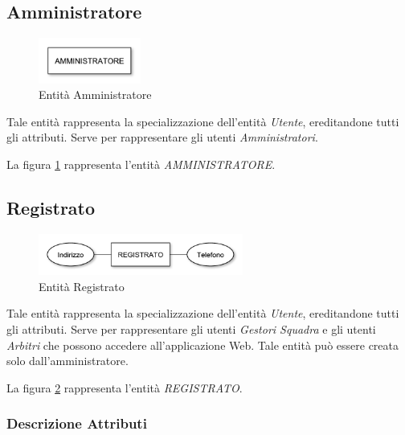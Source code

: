 	\subsection{Amministratore}
	
		\begin{figure}[h]
			\centering
			\includegraphics[width=0.3\textwidth]
			{immagini/02-amministratore}
			
			\caption{Entità Amministratore}
			\label{entita-amministratore}
		\end{figure}
		
		Tale entità rappresenta la specializzazione dell'entità \emph{Utente}, ereditandone tutti gli attributi. Serve per rappresentare gli utenti \emph{Amministratori}.
		
		La figura \ref{entita-amministratore} rappresenta l'entità \emph{AMMINISTRATORE}.
	
	\subsection{Registrato}
	
		\begin{figure}[h]
			\centering
			\includegraphics[width=0.6\textwidth]
			{immagini/03-registrato}
			
			\caption{Entità Registrato}
			\label{entita-registrato}
		\end{figure}
		
		Tale entità rappresenta la specializzazione dell'entità \emph{Utente}, ereditandone tutti gli attributi. Serve per rappresentare gli utenti \emph{Gestori Squadra} e gli utenti \emph{Arbitri} che possono accedere all'applicazione Web. Tale entità può essere creata solo dall'amministratore.
		
		La figura \ref{entita-registrato} rappresenta l'entità \emph{REGISTRATO}.
		
		\subsubsection*{Descrizione Attributi}
		
